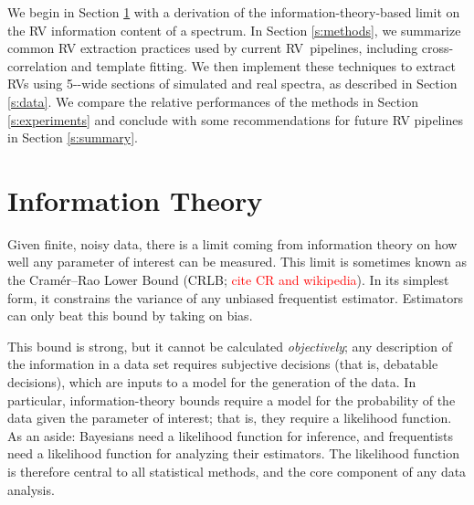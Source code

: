 \documentclass[modern]{aastex62}
\newcommand{\ang}{\text{\normalfont\AA}}
\newcommand{\todo}[1]{\textcolor{red}{#1}}  %
\newcommand{\acronym}[1]{{\small{#1}}}
\newcommand{\RV}{\acronym{RV}}
\newcommand{\CRLB}{\acronym{CRLB}}
\begin{document}
We begin in Section \ref{s:info} with a derivation of the information-theory-based limit on the RV information content of a spectrum. 
In Section \ref{s:methods}, we summarize common RV extraction practices used by current \RV\ pipelines, including cross-correlation and template fitting. 
We then implement these techniques to extract \RV s using 5-\ang-wide sections of simulated and real spectra, as described in Section \ref{s:data}. 
We compare the relative performances of the methods in Section \ref{s:experiments} and conclude with some recommendations for future RV pipelines in Section \ref{s:summary}. 

\section{Information Theory}
\label{s:info}

Given finite, noisy data, there is a limit coming from information
theory on how well any parameter of interest can be measured.
This limit is
sometimes known as the Cram\'er--Rao Lower Bound (\CRLB; \todo{cite CR and wikipedia}).
In its simplest form, it constrains the variance of any unbiased
frequentist estimator.
Estimators can only beat this bound by taking on bias.

This bound is strong, but it cannot be calculated \emph{objectively};
any description of the information in a data set requires
subjective decisions (that is, debatable decisions), which are inputs
to a model for the generation of the data.
In particular, information-theory bounds require a model for the
probability of the data given the parameter of interest; that is, they
require a likelihood function.
As an aside: Bayesians need a likelihood function for inference, and
frequentists need a likelihood function for analyzing their estimators.
The likelihood function is therefore central to all statistical methods,
and the core component of any data analysis.
\end{document}
